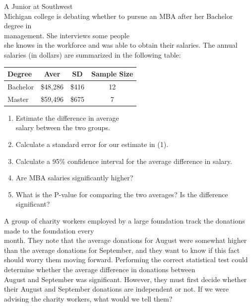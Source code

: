 \documentclass[11pt, chapterprefix=true]{scrbook}\usepackage[]{graphicx}\usepackage[]{color}
\begin{document}
\begin{exercises}
\begin{exercise}
\end{exercise}
\begin{solution}  %

\end{solution}

\begin{exercise}  %

A Junior at Southwest \\ Michigan college is debating whether to pursue an MBA after her Bachelor degree in \\ management.  She interviews some people \\ she  knows in the workforce and was able to obtain their salaries. The annual salaries (in dollars) are summarized in the following table:

\begin{tabular}{@{} lccc @{}} \hline
Degree & Aver & SD & Sample Size \\ \hline
Bachelor & \$48,286 & \$416 & 12 \\
Master   & \$59,496 & \$675 & 7 \\ \hline
\end{tabular}

\begin{enumerate}
  \item Estimate the difference in average \\ salary between the two groups.
  \item Calculate a standard error for our estimate in (1).
  \item Calculate a 95\% confidence interval for the average difference in salary.
  \item Are MBA salaries significantly higher?
  \item What is the P-value for comparing the two averages? Is the difference significant?
\end{enumerate}
\end{exercise}  
\begin{solution}  %

\end{solution}

\begin{exercise}  %

A group of charity workers employed by a large foundation track the donations made to the foundation every \\ month. They note that the average donations for August were somewhat higher than the average donations for September, and they want to know if this fact should worry them moving forward. Performing the correct statistical test could determine whether the average difference in donations between \\ August and  September was significant. However, they  must first decide whether their August and  September donations are independent or not. If we were advising the charity workers, what would we tell them?
\end{exercise}
\begin{solution}  %



\end{solution}
\end{exercises}
\end{document}

